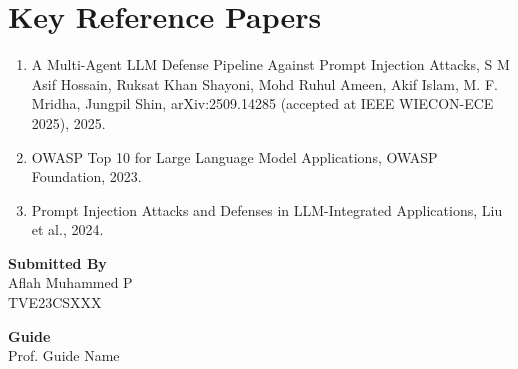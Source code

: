 \documentclass[12pt]{article}
\newcommand{\studentname}{Aflah Muhammed P}
\newcommand{\rollno}{TVE23CSXXX}
\newcommand{\guidename}{Prof. Guide Name}
\begin{document}
\section*{Key Reference Papers}
\begin{enumerate}
  \item A Multi-Agent LLM Defense Pipeline Against Prompt Injection Attacks, S M Asif Hossain, Ruksat Khan Shayoni, Mohd Ruhul Ameen, Akif Islam, M. F. Mridha, Jungpil Shin, arXiv:2509.14285 (accepted at IEEE WIECON-ECE 2025), 2025.
  \item OWASP Top 10 for Large Language Model Applications, OWASP Foundation, 2023.
  \item Prompt Injection Attacks and Defenses in LLM-Integrated Applications, Liu et al., 2024.
\end{enumerate}
\vspace{1.5em}

\noindent\textbf{Submitted By}\\
\studentname\\
\rollno

\vspace{1em}
\noindent\textbf{Guide}\\
\guidename
\end{document}
